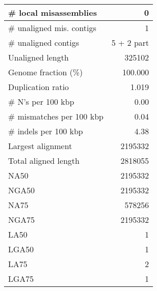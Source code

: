 \documentclass[12pt,a4paper]{article}
\begin{document}
\begin{table}[ht]
\begin{center}
\begin{tabular}{|l*{1}{|r}|}
\# local misassemblies & 0 \\ \hline
\# unaligned mis. contigs & 1 \\ \hline
\# unaligned contigs & 5 + 2 part \\ \hline
Unaligned length & 325102 \\ \hline
Genome fraction (\%) & 100.000 \\ \hline
Duplication ratio & 1.019 \\ \hline
\# N's per 100 kbp & 0.00 \\ \hline
\# mismatches per 100 kbp & 0.04 \\ \hline
\# indels per 100 kbp & 4.38 \\ \hline
Largest alignment & 2195332 \\ \hline
Total aligned length & 2818055 \\ \hline
NA50 & 2195332 \\ \hline
NGA50 & 2195332 \\ \hline
NA75 & 578256 \\ \hline
NGA75 & 2195332 \\ \hline
LA50 & 1 \\ \hline
LGA50 & 1 \\ \hline
LA75 & 2 \\ \hline
LGA75 & 1 \\ \hline
\end{tabular}
\end{center}
\end{table}
\end{document}
